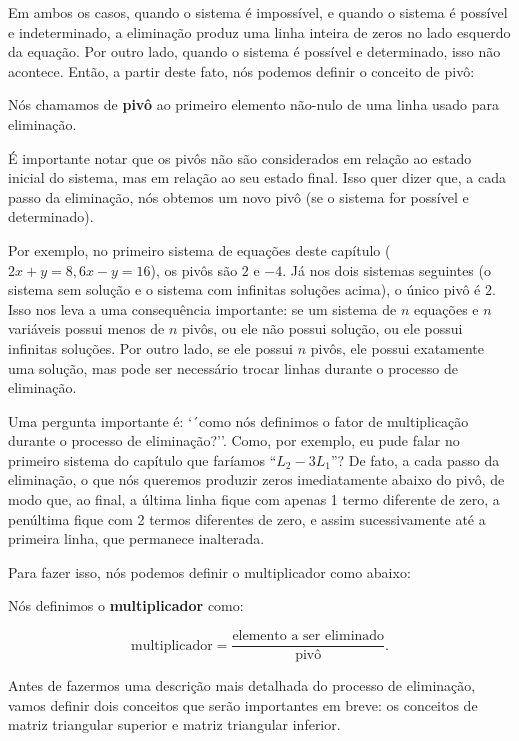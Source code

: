 Em ambos os casos, quando o sistema é impossível, e quando o sistema é possível e indeterminado, a eliminação produz uma linha inteira de zeros no lado esquerdo da equação. Por outro lado, quando o sistema é possível e determinado, isso não acontece. Então, a partir deste fato, nós podemos definir o conceito de pivô:

\begin{Definition}[Pivô]
	Nós chamamos de \textbf{pivô} ao primeiro elemento não-nulo de uma linha usado para eliminação.
\end{Definition}


É importante notar que os pivôs não são considerados em relação ao estado inicial do sistema, mas em relação ao seu estado final. Isso quer dizer que, a cada passo da eliminação, nós obtemos um novo pivô (se o sistema for possível e determinado).

Por exemplo, no primeiro sistema de equações deste capítulo ($2x + y = 8, 6x - y = 16$), os pivôs são $2$ e $-4$. Já nos dois sistemas seguintes (o sistema sem solução e o sistema com infinitas soluções acima), o único pivô é $2$. Isso nos leva a uma consequência importante: se um sistema de $n$ equações e $n$ variáveis possui menos de $n$ pivôs, ou ele não possui solução, ou ele possui infinitas soluções. Por outro lado, se ele possui $n$ pivôs, ele possui exatamente uma solução, mas pode ser necessário trocar linhas durante o processo de eliminação.

Uma pergunta importante é: `´como nós definimos o fator de multiplicação durante o processo de eliminação?''. Como, por exemplo, eu pude falar no primeiro sistema do capítulo que faríamos ``$L_2 - 3L_1$''? De fato, a cada passo da eliminação, o que nós queremos produzir zeros imediatamente abaixo do pivô, de modo que, ao final, a última linha fique com apenas 1 termo diferente de zero, a penúltima fique com 2 termos diferentes de zero, e assim sucessivamente até a primeira linha, que permanece inalterada.

Para fazer isso, nós podemos definir o multiplicador como abaixo:

\begin{Definition}[Multiplicador]
	Nós definimos o \textbf{multiplicador} como:
	
	$$
	\text{multiplicador} = \dfrac{\text{elemento a ser eliminado}}{\text{pivô}}.
	$$
\end{Definition}

Antes de fazermos uma descrição mais detalhada do processo de eliminação, vamos definir dois conceitos que serão importantes em breve: os conceitos de matriz triangular superior e matriz triangular inferior.

